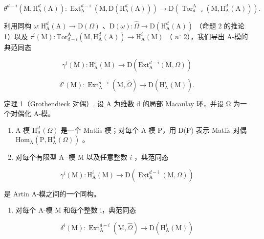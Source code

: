 \[
\theta^ {d - i} (\mathrm{M}, \mathrm{H} _ {\mathrm{A}} ^ {d} (\mathrm{A})): \operatorname{Ext} _ {\mathrm{A}} ^ {d - i} \left(\mathrm{M}, \mathrm{D} \left(\mathrm{H} _ {\mathrm{A}} ^ {d} (\mathrm{A})\right)\right) \longrightarrow \mathrm{D} \left(\operatorname{Tor} _ {d - i} ^ {\mathrm{A}} \left(\mathrm{M}, \mathrm{H} _ {\mathrm{A}} ^ {d} (\mathrm{A})\right)\right).
\]

利用同构 \(\omega : \mathrm{H}_{\mathrm{A}}^{d}(\mathrm{A}) \to \mathrm{D}(\Omega)\) 、\(\mathrm{D}(\omega) : \widehat{\Omega} \to \mathrm{D}(\mathrm{H}_{\mathrm{A}}^{d}(\mathrm{A}))\) （命题 2 的推论 1）以及 \(\tau^{i}(\mathrm{M}) : \mathrm{Tor}_{d-i}^{\mathrm{A}}(\mathrm{M}, \mathrm{H}_{\mathrm{A}}^{d}(\mathrm{A})) \longrightarrow \mathrm{H}_{\mathrm{A}}^{i}(\mathrm{M})\) （ \(n^{\circ}\) 2），我们导出 A-模的典范同态

\[
\gamma^ {i} (\mathrm{M}): \mathrm{H} _ {\mathrm{A}} ^ {i} (\mathrm{M}) \longrightarrow \mathrm{D} \left(\mathrm{Ext} _ {\mathrm{A}} ^ {d - i} (\mathrm{M}, \Omega)\right)
\]

\[
\delta^ {i} (\mathrm{M}): \operatorname{Ext} _ {\mathrm{A}} ^ {d - i} (\mathrm{M}, \widehat {\Omega}) \longrightarrow \mathrm{D} \left(\mathrm{H} _ {\mathrm{A}} ^ {i} (\mathrm{M})\right).
\]

定理 1（Grothendieck 对偶）. 设 A 为维数 d 的局部 Macaulay 环，并设 Ω 为一个对偶化 A-模。

\begin{enumerate}
\def\labelenumi{\alph{enumi})}
\item
  A-模 \(\mathrm{H}_{\mathrm{A}}^{d}(\Omega)\) 是一个 Matlis 模；对每个 A-模 P，用 D(P) 表示 Matlis 对偶 \(\mathrm{Hom}_{\mathrm{A}}(\mathrm{P},\mathrm{H}_{\mathrm{A}}^{d}(\Omega))\) 。
\item
  对每个有限型 \(\mathrm{A}\) -模 M 以及任意整数 \(i\) ，典范同态
\end{enumerate}

\[
\gamma^ {i} (\mathrm{M}): \mathrm{H} _ {\mathrm{A}} ^ {i} (\mathrm{M}) \longrightarrow \mathrm{D} \left(\operatorname{Ext} _ {\mathrm{A}} ^ {d - i} (\mathrm{M}, \Omega)\right)
\]

是 Artin A-模之间的一个同构。

\begin{enumerate}
\def\labelenumi{\alph{enumi})}
\setcounter{enumi}{2}
\tightlist
\item
  对每个 A-模 M 和每个整数 i，典范同态
\end{enumerate}

\[
\delta^ {i} (\mathrm{M}): \operatorname{Ext} _ {\mathrm{A}} ^ {d - i} (\mathrm{M}, \widehat {\Omega}) \longrightarrow \mathrm{D} \left(\mathrm{H} _ {\mathrm{A}} ^ {i} (\mathrm{M})\right)
\]

